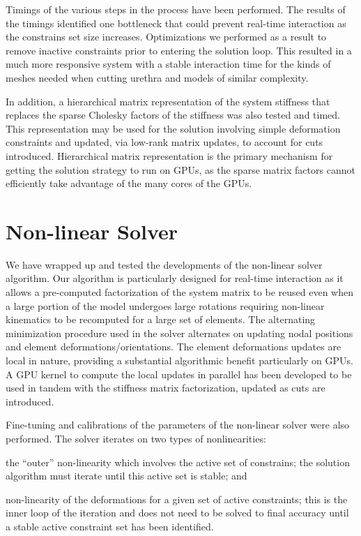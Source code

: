 Timings of the various steps in the process have been performed. The results of the timings identified one bottleneck that could prevent real-time interaction as the constrains set size increases. Optimizations we performed as a result to remove inactive constraints prior to entering the solution loop. This resulted in a much more responsive system with a stable interaction time for the kinds of meshes needed when cutting urethra and models of similar complexity.

In addition, a hierarchical matrix representation of the system stiffness that replaces the sparse Cholesky factors of the stiffness was also tested and timed. This representation may be used for the solution involving simple deformation constraints and updated, via low-rank matrix updates, to account for cuts introduced. Hierarchical matrix representation is the primary mechanism for getting the solution strategy to run on GPUs, as the sparse matrix factors cannot efficiently take advantage of the many cores of the GPUs.

\section{Non-linear Solver}
We have wrapped up and tested the developments of the non-linear solver algorithm. Our algorithm is particularly designed for real-time interaction as it allows a pre-computed factorization of the system matrix to be reused even when a large portion of the model undergoes large rotations requiring non-linear kinematics to be recomputed for a large set of elements. The alternating minimization procedure used in the solver alternates on updating nodal positions and element deformations/orientations. The element deformations updates are local in nature, providing a substantial algorithmic benefit particularly on GPUs. A GPU kernel to compute the local updates in parallel has been developed to be used in tandem with the stiffness matrix factorization, updated as cuts are introduced.

Fine-tuning and calibrations of the parameters of the non-linear solver were also performed.  The  solver iterates on two types of nonlinearities:
\begin{inparaenum}[(1)]
\item the ``outer'' non-linearity which involves the active set of constrains; the solution algorithm must iterate until this active set is stable; and
\item non-linearity of the deformations for a given set of active constraints; this is the inner loop of the iteration and does not need to be solved to final accuracy until a stable active constraint set has been identified.
\end{inparaenum}


